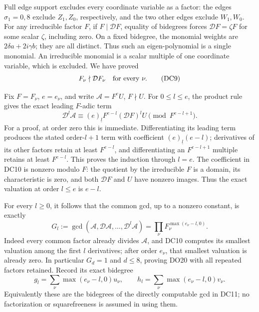 Full edge support excludes every coordinate variable as a factor:
the edges $\sigma_1=0,8$ exclude $Z_1,Z_0$, respectively, and the
two other edges exclude $W_1,W_0$.  For any irreducible factor $F$, if
$F\mid\mathcal DF$, equality of bidegrees forces
$\mathcal DF=\zeta F$ for some scalar $\zeta$, including zero.
On a fixed bidegree, the monomial weights are
$2\delta a+2i\gamma b$; they are all distinct.  Thus such an
eigen-polynomial is a single monomial.  An irreducible monomial is
a scalar multiple of one coordinate variable, which is excluded.
We have proved
\[
 F_\nu\nmid\mathcal D F_\nu\quad\hbox{for every }\nu.           \tag{DC9}
\]

Fix $F=F_\nu$, $e=e_\nu$, and write $\mathcal A=F^e U$, $F\nmid U$.
For $0\le l\le e$, the product rule gives the exact leading
$F$-adic term
\[
 \mathcal D^l\mathcal A
 \equiv (e)_{\underline l}F^{e-l}(\mathcal DF)^l U
                          \pmod {F^{e-l+1}}.                    \tag{DC10}
\]
For a proof, at order zero this is immediate.  Differentiating its
leading term produces the stated order-$l+1$ term with coefficient
$(e)_{\underline l}(e-l)$; derivatives of its other factors retain
at least $F^{e-l}$, and differentiating an $F^{e-l+1}$ multiple
retains at least $F^{e-l}$.  This proves the induction through $l=e$.
The coefficient in DC10 is nonzero modulo $F$: the quotient by the
irreducible $F$ is a domain, its characteristic is zero, and both
$\mathcal DF$ and $U$ have nonzero images.  Thus the exact valuation
at order $l\le e$ is $e-l$.

For every $l\ge0$, it follows that the common gcd, up to a nonzero
constant, is exactly
\[
 G_l:=\gcd(\mathcal A,\mathcal D\mathcal A,\ldots,
                       \mathcal D^l\mathcal A)
       =\prod_\nu F_\nu^{\max(e_\nu-l,0)}.                       \tag{DC11}
\]
Indeed every common factor already divides $\mathcal A$, and DC10
computes its smallest valuation among the first $l$ derivatives;
after order $e_\nu$, that smallest valuation is already zero.
In particular $G_d=1$ and $d\le8$, proving DO20 with all repeated
factors retained.  Record its exact bidegree
\[
 g_l=\sum_\nu\max(e_\nu-l,0)u_\nu,\qquad
 h_l=\sum_\nu\max(e_\nu-l,0)v_\nu.                              \tag{DC12}
\]
Equivalently these are the bidegrees of the directly computable gcd
in DC11; no factorization or squarefreeness is assumed in using them.

